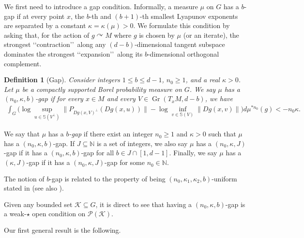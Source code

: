 \documentclass[11pt, leqno, fleqn]{amsart}
\def \N{{\mathbb N}}
\DeclareMathOperator{\Gr}{Gr}
\newcommand{\acts}{\curvearrowright}
\newcommand{\cP}{{\mathcal P}}
\newcommand{\cK}{{\mathcal K}}
\newcommand{\aryst}{\begin{eqnarray*}}
\newcommand{\earyst}{\end{eqnarray*}}
\newtheorem{thm}{\bf Theorem}[section]
\newtheorem{defi}[thm]{\bf Definition}
\theoremstyle{definition}
\theoremstyle{definition}
\def\S{ {\mathbb{S}} }
\def \vol{  {\rm vol} }
\newcommand{\Diff}{{\rm Diff}}
\begin{document}
	We first need to  introduce a gap condition. Informally, a measure $\mu$ on $G$ has a $b$-gap if at every point $x$, the $b$-th and $(b+1)$-th smallest Lyapunov exponents  are separated by a constant $\kappa=\kappa(\mu)>0$.
 We formulate this condition by asking that, for the action of $g \acts M$ where $g$ is chosen by $\mu$ (or an iterate),  the strongest \lq\lq contraction\rq\rq \ along any $(d-b)$-dimensional tangent subspace dominates the strongest \lq\lq expansion\rq\rq \ along its $b$-dimensional orthogonal complement.   
 

 
\begin{defi}[Gap] \label{def gap} 
	Consider integers $1 \leq b \leq d-1$, $n_0 \geq 1$, and a real $\kappa > 0$. Let $\mu$ be a compactly supported Borel probability measure on $G$. We say $\mu$  has a {\em $(n_0, \kappa, b)$-gap } if for every $x \in M$ and every $V \in \Gr(T_x M, d - b)$, we have
	\aryst
	 	\int_{G}  \Big ( \log \sup_{u \in \S(V^{\perp})} \| P_{Dg(x, V)^{\perp}}(  Dg(x, u) ) \| - \log \inf_{v \in \S(V)} \| Dg(x, v) \|  \Big )  d\mu^{* n_0}(g) < - n_0 \kappa.
	\earyst

\end{defi}
	We say that $\mu$ has a {\em $b$-gap}  if there exist an integer $n_0 \geq 1$ and   $\kappa > 0$ such that $\mu$ has a $(n_{0}, \kappa,  b)$-gap. 
If $J\subseteq \N$ is a set of integers, we also say $\mu$ has a $(n_0, \kappa, J)$-gap if it has a $(n_0, \kappa, b)$-gap for all $b\in J\cap [1, d-1]$. Finally, we say $\mu$ has a $(\kappa, J)$-gap if it has a $(n_0, \kappa, J)$-gap for some $n_{0}\in \N$.
 
 The notion of $b$-gap is related to the property of being $(n_0, \kappa_1,  \kappa_2,  b)$-uniform stated in \cite[Definition 8]{Z} (see also \cite[Definition 1.1]{DDZ}). 
 
Given any bounded set $\cK\subseteq G$, it is direct to see that  having a  $(n_0, \kappa, b)$-gap is a weak-$\star$  open condition on $\cP(\cK)$.  

\bigskip

Our first general result is the following. 
%
\end{document}
